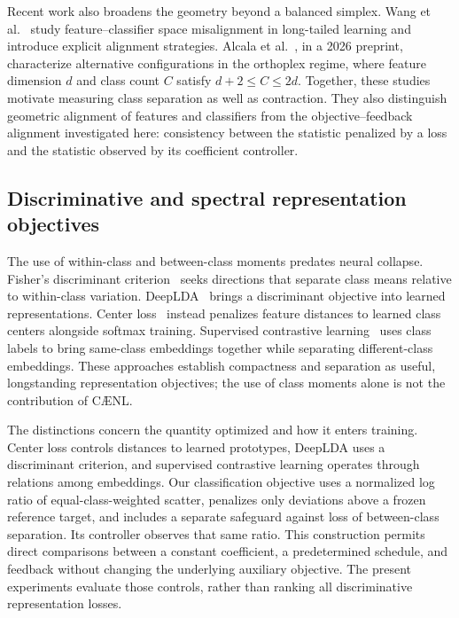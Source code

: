 \documentclass[10pt,a4paper,twocolumn]{article}
\newcommand{\model}{C\AE{}NL}
\begin{document}
Recent work also broadens the geometry beyond a balanced simplex.
Wang et al.~\cite{wang2026alignment} study feature--classifier space
misalignment in long-tailed learning and introduce explicit alignment
strategies. Alcala et al.~\cite{alcala2026orthoplex}, in a 2026 preprint,
characterize alternative configurations in the orthoplex regime,
where feature dimension $d$ and class count $C$ satisfy $d+2\le C\le2d$. Together, these
studies motivate measuring class separation as well as contraction.
They also distinguish geometric alignment of features and classifiers
from the objective--feedback alignment investigated here: consistency
between the statistic penalized by a loss and the statistic observed
by its coefficient controller.

\subsection{Discriminative and spectral representation objectives}
\label{sec:related_regularization}

The use of within-class and between-class moments predates neural
collapse. Fisher's discriminant criterion~\cite{fisher1936} seeks
directions that separate class means relative to within-class variation.
DeepLDA~\cite{dorfer2016deeplda} brings a discriminant objective into
learned representations. Center loss~\cite{wen2016center} instead
penalizes feature distances to learned class centers alongside softmax
training. Supervised contrastive learning~\cite{khosla2020supervised}
uses class labels to bring same-class embeddings together while
separating different-class embeddings. These approaches establish
compactness and separation as useful, longstanding representation
objectives; the use of class moments alone is not the contribution
of \model{}.

The distinctions concern the quantity optimized and how it enters
training. Center loss controls distances to learned prototypes, DeepLDA
uses a discriminant criterion, and supervised contrastive learning
operates through relations among embeddings. Our classification
objective uses a normalized log ratio of equal-class-weighted scatter,
penalizes only deviations above a frozen reference target, and includes
a separate safeguard against loss of between-class separation.
Its controller observes that same ratio. This construction permits
direct comparisons between a constant coefficient, a predetermined
schedule, and feedback without changing the underlying auxiliary
objective. The present experiments evaluate those controls, rather
than ranking all discriminative representation losses.
\end{document}
